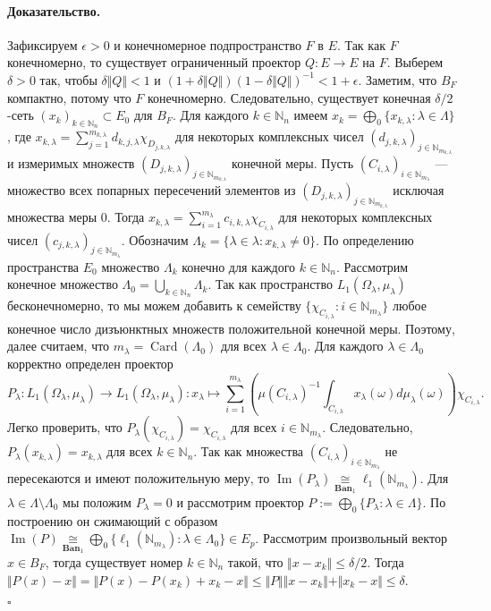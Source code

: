 \documentclass[12pt]{article}
\newcommand{\isom}[1]{\mathop{\mathbin{\cong}}\limits_{#1}}
\renewenvironment{proof}{\paragraph{Доказательство.}}{\hfill$\square$\medskip}
\begin{document}
\begin{proof}
    Зафиксируем $\epsilon>0$ и конечномерное подпространство $F$ в $E$. Так как
    $F$ конечномерно, то существует ограниченный проектор $Q:E\to E$ на $F$.
    Выберем $\delta>0$ так, чтобы $\delta\Vert Q\Vert<1$ и $(1+\delta\Vert
        Q\Vert){(1-\delta\Vert Q\Vert)}^{-1}<1+\epsilon$. Заметим, что $B_F$
    компактно, потому что $F$ конечномерно. Следовательно, существует конечная
    $\delta/2$-сеть ${(x_k)}_{k\in\mathbb{N}_n}\subset E_0$ для $B_F$. Для
    каждого $k\in\mathbb{N}_n$ имеем $x_k=\bigoplus_0
        \{x_{k,\lambda}:\lambda\in\Lambda \}$, где
    $x_{k,\lambda}
        =\sum_{j=1}^{m_{k,\lambda}}d_{k,j,\lambda}\chi_{D_{j,k,\lambda}}$
    для некоторых комплексных чисел
    ${(d_{j,k,\lambda})}_{j\in\mathbb{N}_{m_{k,\lambda}}}$ и измеримых множеств
    ${(D_{j,k,\lambda})}_{j\in\mathbb{N}_{m_{k,\lambda}}}$ конечной меры. Пусть
    ${(C_{i,\lambda})}_{i\in\mathbb{N}_{m_\lambda}}$ --- множество всех попарных
    пересечений элементов из
    ${(D_{j,k,\lambda})}_{j\in\mathbb{N}_{m_{k,\lambda}}}$ исключая множества
    меры $0$. Тогда $x_{k,\lambda}=\sum_{i=1}^{m_\lambda}
        c_{i,k,\lambda}\chi_{C_{i,\lambda}}$ для некоторых комплексных чисел
    ${(c_{j,k,\lambda})}_{j\in\mathbb{N}_{m_{\lambda}}}$. Обозначим $\Lambda_k=
        \{\lambda\in\lambda:x_{k,\lambda}\neq 0 \}$. По определению пространства
    $E_0$ множество $\Lambda_k$ конечно для каждого $k\in\mathbb{N}_n$.
    Рассмотрим конечное множество
    $\Lambda_0=\bigcup_{k\in\mathbb{N}_n}\Lambda_k$. Так как пространство
    $L_1(\Omega_\lambda, \mu_\lambda)$ бесконечномерно, то мы можем добавить к
    семейству $ \{\chi_{C_{i,\lambda}}:i\in\mathbb{N}_{m_\lambda} \}$ любое
    конечное число дизъюнктных множеств положительной конечной меры. Поэтому,
    далее считаем, что $m_\lambda=\operatorname{Card}(\Lambda_0)$ для всех
    $\lambda\in\Lambda_0$. Для каждого $\lambda\in\Lambda_0$ корректно определен
    проектор
    $$
        P_\lambda:L_1(\Omega_\lambda,\mu_\lambda)\to
        L_1(\Omega_\lambda,\mu_\lambda):
        x_\lambda\mapsto
        \sum_{i=1}^{m_\lambda}
        \left(
        {\mu(C_{i,\lambda})}^{-1}
        \int_{C_{i,\lambda}}x_\lambda(\omega)d\mu_\lambda(\omega)
        \right)\chi_{C_{i,\lambda}}.
    $$
    Легко проверить, что $P_\lambda(\chi_{C_{i,\lambda}})=\chi_{C_{i,\lambda}}$
    для всех $i\in\mathbb{N}_{m_\lambda}$. Следовательно,
    $P_\lambda(x_{k,\lambda})=x_{k,\lambda}$ для всех $k\in\mathbb{N}_n$. Так
    как множества ${(C_{i,\lambda})}_{i\in\mathbb{N}_{m_\lambda}}$ не
    пересекаются и имеют положительную меру, то
    $\operatorname{Im}(P_\lambda)\isom{\mathbf{Ban}_1}
        \ell_1(\mathbb{N}_{m_\lambda})$.
    Для $\lambda\in\Lambda\setminus\Lambda_0$ мы положим $P_\lambda=0$ и
    рассмотрим проектор $P:=\bigoplus_0 \{P_\lambda:\lambda\in\Lambda \}$. По
    построению он сжимающий с образом
    $\operatorname{Im}(P)\isom{\mathbf{Ban}_1}\bigoplus_0
        \{\ell_1(\mathbb{N}_{m_\lambda}):\lambda\in\Lambda_0 \}\in E_{p}$.
    Рассмотрим произвольный вектор $x\in B_F$, тогда существует номер
    $k\in\mathbb{N}_n$ такой, что $\Vert x-x_k\Vert\leq \delta/2$. Тогда $\Vert
        P(x)-x\Vert=\Vert P(x)-P(x_k)+x_k-x\Vert\leq\Vert P\Vert\Vert
        x-x_k\Vert+\Vert x_k-x\Vert\leq\delta$.


\end{proof}
\end{document}
